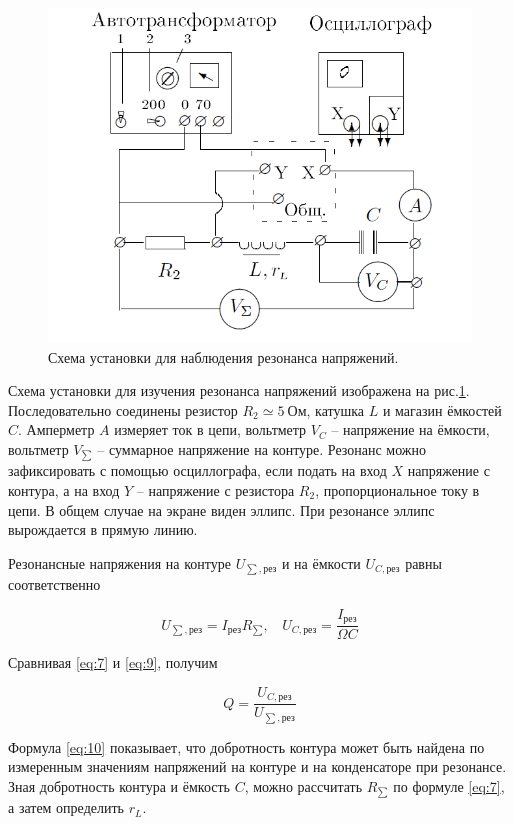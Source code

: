\documentclass[a4paper, 12pt, twoside]{article}
\begin{document}
\begin{figure}[H]
	\centering
	\includegraphics[width = 0.7\linewidth]{sch2}
	\caption{Схема установки для наблюдения резонанса напряжений.}
	\label{sch:2}
\end{figure}

Схема установки для изучения резонанса напряжений изображена на рис.\ref{sch:2}. Последовательно соединены резистор $R_2\simeq 5~\text{Ом}$, катушка $L$ и магазин ёмкостей $C$. Амперметр $A$ измеряет ток в цепи, вольтметр $V_C$ -- напряжение на ёмкости, вольтметр $V_{\sum}$ -- суммарное напряжение на контуре. Резонанс можно зафиксировать с помощью осциллографа, если подать на вход $X$ напряжение с контура, а на вход $Y$ -- напряжение с резистора $R_2$, пропорциональное току в цепи. В общем случае на экране виден эллипс. При резонансе эллипс вырождается в прямую линию.

Резонансные напряжения на контуре $U_{\sum,\text{рез}}$ и на ёмкости $U_{C,\text{рез}}$ равны соответственно

\begin{equation}
\label{eq:9}
U_{\sum,\text{рез}} = I_{\text{рез}}R_{\sum},~~~~U_{C,\text{рез}} = \dfrac{I_\text{рез}}{\Omega C}
\end{equation}

Сравнивая \eqref{eq:7} и \eqref{eq:9}, получим 

\begin{equation}
\label{eq:10}
Q = \dfrac{U_{C,\text{рез}}}{U_{\sum,\text{рез}}}
\end{equation}

Формула \eqref{eq:10} показывает, что добротность контура может быть найдена по измеренным значениям напряжений на контуре и на конденсаторе при резонансе. Зная добротность контура и ёмкость $C$, можно рассчитать $R_{\sum}$ по формуле \eqref{eq:7}, а затем определить $r_L$.
\end{document}
